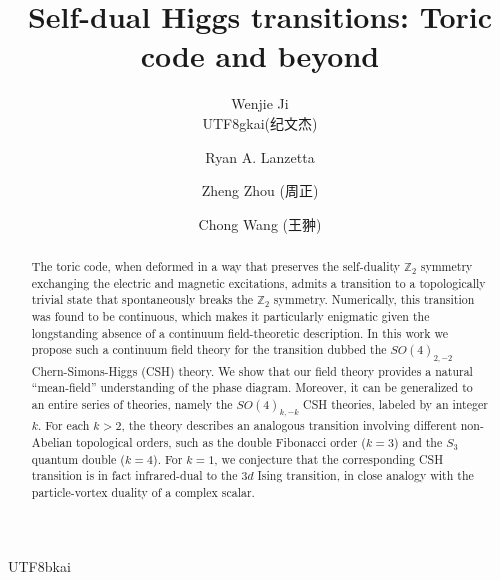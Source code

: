 \documentclass[aps, prl, superscriptaddress, twocolumn,
notitlepage, longbibliography,
floatfix]{revtex4-2}
\newcommand{\1}{\text{\uppercase\expandafter{\romannumeral1}}}
\newcommand{\2}{\text{\uppercase\expandafter{\romannumeral2}}}
\newcommand{\3}{\text{\uppercase\expandafter{\romannumeral3}}}
\newcommand{\4}{\text{\uppercase\expandafter{\romannumeral4}}}
\newcommand{\5}{\text{\uppercase\expandafter{\romannumeral5}}}
\newcommand{\6}{\text{\uppercase\expandafter{\romannumeral6}}}
\begin{document}
\author{Wenjie Ji \begin{CJK*}{UTF8}{gkai}(纪文杰)\end{CJK*}}

\author{Ryan A. Lanzetta}

\author{Zheng Zhou (周正)}

\author{Chong Wang (王翀)}

\title{Self-dual Higgs transitions: Toric code and beyond}

\begin{abstract}
The toric code, when deformed in a way that preserves the self-duality $\mathbb{Z}_2$ symmetry exchanging the electric and magnetic excitations, admits a transition to a topologically trivial state that spontaneously breaks the $\mathbb{Z}_2$ symmetry. Numerically, this transition was found to be continuous, which makes it particularly enigmatic given the longstanding absence of a continuum field-theoretic description. In this work we propose such a continuum field theory for the transition dubbed the $SO(4)_{2,-2}$ Chern-Simons-Higgs (CSH) theory. We show that our field theory provides a natural ``mean-field'' understanding of the phase diagram. Moreover, it can be generalized to an entire series of theories, namely the $SO(4)_{k,-k}$ CSH theories, labeled by an integer $k$. For each $k>2$, the theory describes an analogous transition involving different non-Abelian topological orders, such as the double Fibonacci order ($k=3$) and the $S_3$ quantum double ($k=4$). For $k=1$, we conjecture that the corresponding CSH transition is in fact infrared-dual to the $3d$ Ising transition, in close analogy with the particle-vortex duality of a complex scalar.

\end{abstract}

\begin{CJK*}{UTF8}{bkai}
\maketitle
\end{CJK*}
\end{document}
